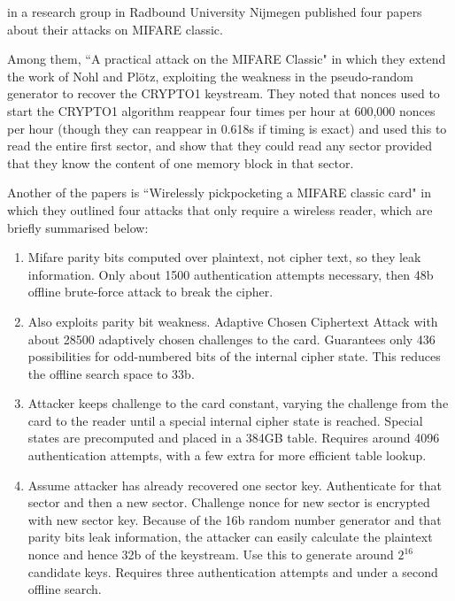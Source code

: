 \documentclass[12pt,a4paper]{article}
\begin{document}
in a research group in Radbound University Nijmegen published four papers about their attacks on MIFARE classic. 

Among them, ``A practical attack on the MIFARE Classic" in which they extend the work of Nohl and Pl\"otz, exploiting the weakness in the pseudo-random generator to recover the CRYPTO1 keystream. They noted that nonces used to start the CRYPTO1 algorithm reappear four times per hour at 600,000 nonces per hour (though they can reappear in 0.618s if timing is exact) and used this to read the entire first sector, and show that they could read any sector provided that they know the content of one memory block in that sector.

Another of the papers is ``Wirelessly pickpocketing a MIFARE classic card" in which they outlined four attacks that only require a wireless reader, which are briefly summarised below:
\begin{enumerate}
	\item Mifare parity bits computed over plaintext, not cipher text, so they leak information. Only about 1500 authentication attempts necessary, then 48b offline brute-force attack to break the cipher.
	
	\item Also exploits parity bit weakness. Adaptive Chosen Ciphertext Attack with about 28500 adaptively chosen challenges to the card. Guarantees only 436 possibilities for odd-numbered bits of the internal cipher state. This reduces the offline search space to 33b.
	
	\item Attacker keeps challenge to the card constant, varying the challenge from the card to the reader until a special internal cipher state is reached. Special states are precomputed and placed in a 384GB table. Requires around 4096 authentication attempts, with a few extra for more efficient table lookup.
	
	\item Assume attacker has already recovered one sector key. Authenticate for that sector and then a new sector. Challenge nonce for new sector is encrypted with new sector key. Because of the 16b random number generator and that parity bits leak information, the attacker can easily calculate the plaintext nonce and hence 32b of the keystream. Use this to generate around $2^{16}$ candidate keys. Requires three authentication attempts and under a second offline search.
\end{enumerate}
\end{document}
